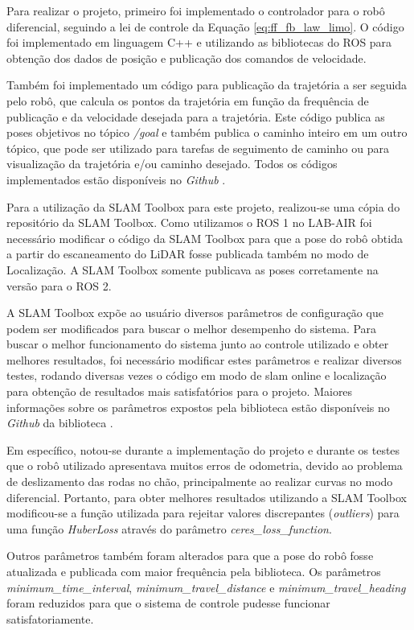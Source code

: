     Para realizar o projeto, primeiro foi implementado o controlador para o robô diferencial, seguindo a lei de controle da Equação \ref{eq:ff_fb_law_limo}. O código foi implementado em linguagem C++ e utilizando as bibliotecas do ROS para obtenção dos dados de posição e publicação dos comandos de velocidade.
    
    Também foi implementado um código para publicação da trajetória a ser seguida pelo robô, que calcula os pontos da trajetória em função da frequência de publicação e da velocidade desejada para a trajetória. Este código publica as poses objetivos no tópico \textit{/goal} e também publica o caminho inteiro em um outro tópico, que pode ser utilizado para tarefas de seguimento de caminho ou para visualização da trajetória e/ou caminho desejado. Todos os códigos implementados estão disponíveis no \textit{Github} \cite{site:Github-SLAM_Research}.

    Para a utilização da SLAM Toolbox para este projeto, realizou-se uma cópia do repositório da SLAM Toolbox\cite{site:Slam_toolbox}. Como utilizamos o ROS 1 no LAB-AIR foi necessário modificar o código da SLAM Toolbox para que a pose do robô obtida a partir do escaneamento do LiDAR fosse publicada também no modo de Localização. A SLAM Toolbox somente publicava as poses corretamente na versão para o ROS 2.

    A SLAM Toolbox expõe ao usuário diversos parâmetros de configuração que podem ser modificados para buscar o melhor desempenho do sistema. Para buscar o melhor funcionamento do sistema junto ao controle utilizado e obter melhores resultados, foi necessário modificar estes parâmetros e realizar diversos testes, rodando diversas vezes o código em modo de slam online e localização para obtenção de resultados mais satisfatórios para o projeto. Maiores informações sobre os parâmetros expostos pela biblioteca estão disponíveis no \textit{Github} da biblioteca \cite{site:Slam_toolbox}.
    
    Em específico, notou-se durante a implementação do projeto e durante os testes que o robô utilizado apresentava muitos erros de odometria, devido ao problema de deslizamento das rodas no chão, principalmente ao realizar curvas no modo diferencial. Portanto, para obter melhores resultados utilizando a SLAM Toolbox modificou-se a função utilizada para rejeitar valores discrepantes (\textit{outliers}) para uma função \textit{HuberLoss} através do parâmetro \textit{ceres\_loss\_function}.

    Outros parâmetros também foram alterados para que a pose do robô fosse atualizada e publicada com maior frequência pela biblioteca. Os parâmetros \textit{minimum\_time\_interval}, \textit{minimum\_travel\_distance} e \textit{minimum\_travel\_heading} foram reduzidos para que o sistema de controle pudesse funcionar satisfatoriamente.
    

